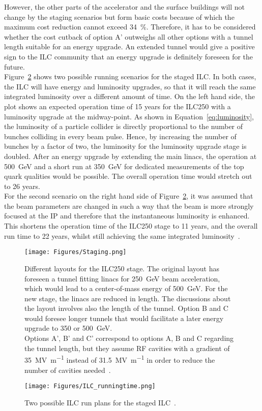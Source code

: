 However, the other parts of the accelerator and the surface buildings will not change by the staging scenarios but form basic costs because of which the maximum cost reduction cannot exceed \SI{34}{\percent}.
Therefore, it has to be considered whether the cost cutback of option A' outweighs all other options with a tunnel length suitable for an energy upgrade.
An extended tunnel would give a positive sign to the ILC community that an energy upgrade is definitely foreseen for the future.
\\Figure~\ref{fig:ILC_runningtime} shows two possible running scenarios for the staged ILC.
In both cases, the ILC will have energy and luminosity upgrades, so that it will reach the same integrated luminosity over a different amount of time.
On the left hand side, the plot shows an expected operation time of 15 years for the ILC250 with a luminosity upgrade at the midway-point.
As shown in Equation~\ref{eq:luminosity}, the luminosity of a particle collider is directly proportional to the number of bunches colliding in every beam pulse.
Hence, by increasing the number of bunches by a factor of two, the luminosity for the luminosity upgrade stage is doubled.
After an energy upgrade by extending the main linacs, the operation at \SI{500}{\GeV} and a short run at \SI{350}{\GeV} for dedicated measurements of the top quark qualities would be possible.
The overall operation time would stretch out to 26 years.\\
For the second scenario on the right hand side of Figure~\ref{fig:ILC_runningtime}, it was assumed that the beam parameters are changed in such a way that the beam is more strongly focused at the IP and therefore that the instantaneous luminosity is enhanced.
This shortens the operation time of the ILC250 stage to 11 years, and the overall run time to 22 years, whilst still achieving the same integrated luminosity~\cite[p. 7]{PhysicsCase}.
\begin{figure}
\centering
\texttt{[image: Figures/Staging.png]}
\caption[Different layouts for the ILC250 stage]{Different layouts for the ILC250 stage.
The original layout has foreseen a tunnel fitting linacs for \SI{250}{\GeV} beam acceleration, which would lead to a center-of-mass energy of \SI{500}{\GeV}.
For the new stage, the linacs are reduced in length.
The discussions about the layout involves also the length of the tunnel.
Option B and C would foresee longer tunnels that would facilitate a later energy upgrade to 350 or \SI{500}{\GeV}.\\
Options A', B' and C' correspond to options A, B and C regarding the tunnel length, but they assume RF cavities with a gradient of \SI{35}{\mega\volt\per\meter} instead of \SI{31.5}{\mega\volt\per\meter} in order to reduce the number of cavities needed~\cite[p. 19]{Staging}.}
\label{fig:Staging}
\end{figure}
\begin{figure}[htbp]
\centering
\texttt{[image: Figures/ILC\_runningtime.png]}
\caption[ILC run plan]{Two possible ILC run plans for the staged ILC~\cite[p. 8]{PhysicsCase}.}
\label{fig:ILC_runningtime}
\end{figure}

